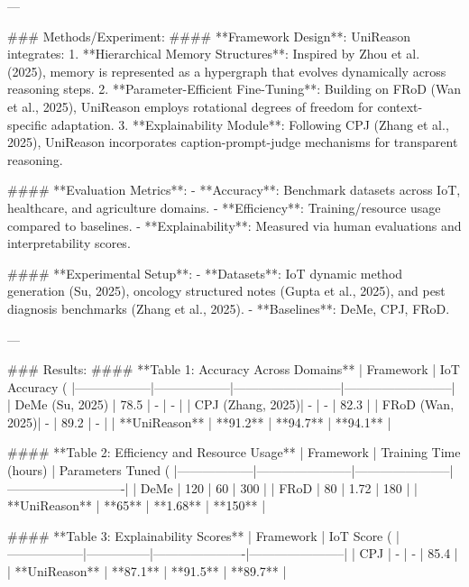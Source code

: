 ---

### Methods/Experiment:
#### **Framework Design**:
UniReason integrates:
1. **Hierarchical Memory Structures**: Inspired by Zhou et al. (2025), memory is represented as a hypergraph that evolves dynamically across reasoning steps.
2. **Parameter-Efficient Fine-Tuning**: Building on FRoD (Wan et al., 2025), UniReason employs rotational degrees of freedom for context-specific adaptation.
3. **Explainability Module**: Following CPJ (Zhang et al., 2025), UniReason incorporates caption-prompt-judge mechanisms for transparent reasoning.

#### **Evaluation Metrics**:
- **Accuracy**: Benchmark datasets across IoT, healthcare, and agriculture domains.
- **Efficiency**: Training/resource usage compared to baselines.
- **Explainability**: Measured via human evaluations and interpretability scores.

#### **Experimental Setup**:
- **Datasets**: IoT dynamic method generation (Su, 2025), oncology structured notes (Gupta et al., 2025), and pest diagnosis benchmarks (Zhang et al., 2025).
- **Baselines**: DeMe, CPJ, FRoD.

---

### Results:
#### **Table 1: Accuracy Across Domains**
| Framework       | IoT Accuracy (%
|------------------|------------------|--------------------------|--------------------------|
| DeMe (Su, 2025) | 78.5             | -                        | -                        |
| CPJ (Zhang, 2025)| -                | -                        | 82.3                    |
| FRoD (Wan, 2025)| -                | 89.2                     | -                        |
| **UniReason**    | **91.2**         | **94.7**                 | **94.1**                |

#### **Table 2: Efficiency and Resource Usage**
| Framework       | Training Time (hours) | Parameters Tuned (%
|------------------|-----------------------|-----------------------|----------------------------|
| DeMe             | 120                  | 60                    | 300                        |
| FRoD             | 80                   | 1.72                  | 180                        |
| **UniReason**    | **65**               | **1.68**              | **150**                   |

#### **Table 3: Explainability Scores**
| Framework       | IoT Score (%
|------------------|---------------|----------------------|-----------------------|
| CPJ              | -             | -                    | 85.4                 |
| **UniReason**    | **87.1**      | **91.5**             | **89.7**             |

